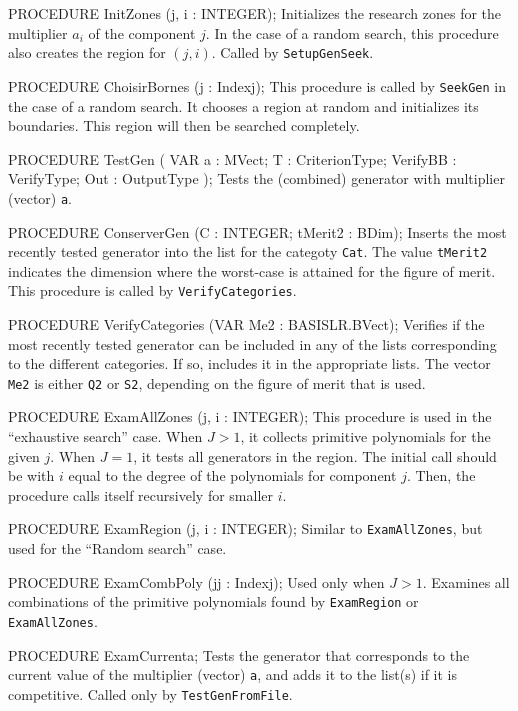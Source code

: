 PROCEDURE InitZones (j, i : INTEGER);
\endcode
 \tab
  Initializes the research zones for the multiplier $a_i$ of the
  component $j$.
  In the case of a random search, this procedure also creates the
  region for $(j,i)$.    Called by {\tt SetupGenSeek}.
 \endtab
\code

PROCEDURE ChoisirBornes (j : Indexj);
\endcode
  \tab  This procedure is called by {\tt SeekGen} in the case of a
    random search.  It chooses a region at random and 
    initializes its boundaries.  This region will then be searched
    completely.  
  \endtab
\code

PROCEDURE TestGen
   ( VAR a    : MVect;
     T        : CriterionType;
     VerifyBB : VerifyType;
     Out      : OutputType
   );
\endcode
 \tab
   Tests the (combined) generator with multiplier (vector) {\tt a}.
 \endtab
\code

PROCEDURE ConserverGen (C : INTEGER;  tMerit2 : BDim);
\endcode
 \tab
   Inserts the most recently tested generator into the list
   for the categoty {\tt Cat}.
   The value {\tt tMerit2} indicates the dimension where the
   worst-case is attained for the figure of merit.
   This procedure is called by {\tt VerifyCategories}.
 \endtab
\code

PROCEDURE VerifyCategories (VAR Me2 : BASISLR.BVect);
\endcode
 \tab
  Verifies if the most recently tested generator can be included
  in any of the lists corresponding to the different categories.
  If so, includes it in the appropriate lists. 
  The vector {\tt Me2} is either {\tt Q2} or {\tt S2}, depending
  on the figure of merit that is used.
 \endtab
\code

PROCEDURE ExamAllZones (j, i : INTEGER);
\endcode
 \tab
  This procedure is used in the ``exhaustive search'' case. 
  When $J > 1$, it collects primitive polynomials for the given $j$.
  When $J = 1$, it tests all generators in the region.
  The initial call should be with $i$ equal to the degree of the
  polynomials for component $j$.
  Then, the procedure calls itself recursively for smaller $i$.
 \endtab
\code

PROCEDURE ExamRegion (j, i : INTEGER);
\endcode
 \tab
  Similar to {\tt ExamAllZones}, but used for the ``Random search'' case.
 \endtab
\code

PROCEDURE ExamCombPoly (jj : Indexj);
\endcode
 \tab
  Used only when $J > 1$.  Examines all combinations of the primitive
  polynomials found by {\tt ExamRegion} or {\tt ExamAllZones}.
 \endtab 
\code

PROCEDURE ExamCurrenta;
\endcode
 \tab
  Tests the generator that corresponds to the current value of the
  multiplier (vector) {\tt a}, and adds it to the list(s) if it is competitive.
  Called only by {\tt TestGenFromFile}.
 \endtab
\code

